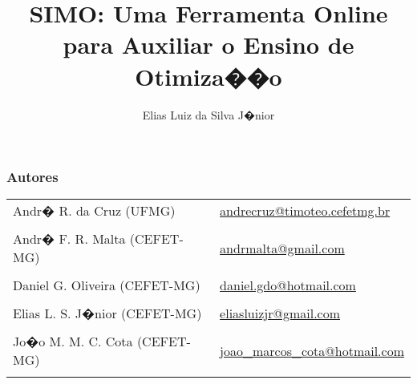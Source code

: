 \documentclass[handout]{beamer}
\begin{document}
\title{SIMO: Uma Ferramenta Online para Auxiliar o Ensino de Otimiza��o}
\author{Elias Luiz da Silva J�nior}
\date{}

\begin{frame}
\titlepage
\end{frame}

\begin{frame}\frametitle{Autores}
	\begin{tabular}{ll}
		Andr� R. da Cruz (UFMG) & \url{andrecruz@timoteo.cefetmg.br}\\ \\
		Andr� F. R. Malta (CEFET-MG) & \url{andrmalta@gmail.com}\\ \\
		Daniel G. Oliveira (CEFET-MG) & \url{daniel.gdo@hotmail.com}\\ \\
		Elias L. S. J�nior (CEFET-MG) & \url{eliasluizjr@gmail.com}\\ \\
		Jo�o M. M. C. Cota (CEFET-MG) & \url{joao\_marcos\_cota@hotmail.com}\\ \\
	\end{tabular}
\end{frame}
\end{document}
